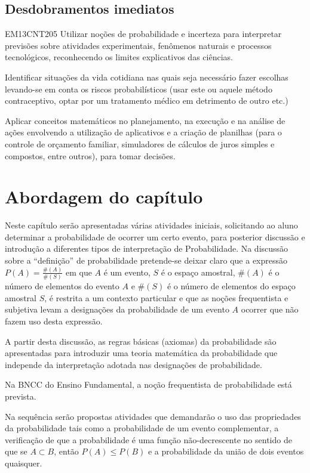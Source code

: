 \begin{apresentacao}
\columnbreak
\subsection{Desdobramentos imediatos}

\begin{habilities}{EM13CNT205}
Utilizar noções de probabilidade e incerteza para interpretar previsões sobre atividades experimentais, fenômenos naturais e processos tecnológicos, reconhecendo os limites explicativos das ciências.

Identificar situações da vida cotidiana nas quais seja necessário fazer escolhas levando-se em conta os riscos probabilísticos (usar este ou aquele método contraceptivo, optar por um tratamento médico em detrimento de outro etc.)

Aplicar conceitos matemáticos no planejamento, na execução e na análise de ações envolvendo a utilização de aplicativos e a criação de planilhas (para o controle de orçamento familiar, simuladores de cálculos de juros simples e compostos, entre outros), para tomar decisões.
\end{habilities}

\section{Abordagem do capítulo}
Neste capítulo serão apresentadas várias atividades iniciais, solicitando ao aluno determinar a probabilidade de ocorrer um certo evento, para posterior discussão e introdução a diferentes tipos de interpretação de Probabilidade. Na discussão sobre a “definição”{} de probabilidade pretende-se deixar claro que a expressão $P(A)=\frac{\#(A)}{\#(S)}$ em que $A$ é um evento, $S$ é o espaço amostral, $\#(A)$ é o número de elementos do evento $A$ e $\#(S)$ é o número de elementos do espaço amostral $S$, é restrita a um contexto particular e que as noções frequentista e subjetiva levam a designações da probabilidade de um evento $A$ ocorrer que não fazem uso desta expressão.

A partir desta discussão, as regras básicas (axiomas) da probabilidade são apresentadas para introduzir uma teoria matemática da probabilidade que independe da interpretação adotada nas designações de probabilidade.

Na BNCC do Ensino Fundamental, a noção frequentista de probabilidade está prevista.

Na sequência serão propostas atividades que demandarão o uso das propriedades da probabilidade tais como a probabilidade de um evento complementar, a verificação de que a probabilidade é uma função não-decrescente no sentido de que se $A\subset B$, então $P(A)\leq P(B)$ e a probabilidade da união de dois eventos quaisquer.


\end{apresentacao}
